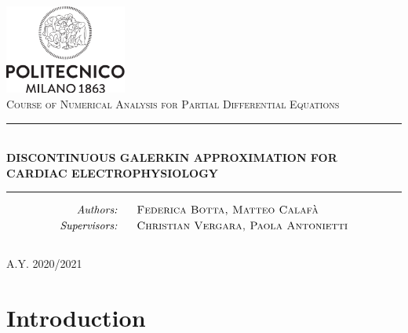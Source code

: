 \documentclass[a4paper,12pt]{article}
\begin{document}
	
	\begin{titlepage}
	    \thispagestyle{empty}
	    \begin{center}
	    	\includegraphics[width = 4cm]{./polimi-logo.png}\\ \vspace{3mm}
	    	\normalsize{\textsc{Course of Numerical Analysis for Partial Differential Equations}}
	    	
	    	\vspace{20mm}
	    	\rule{15cm}{0.1mm} \\ \vspace{4.5mm}
	    	 \Huge{\textbf{DISCONTINUOUS GALERKIN APPROXIMATION FOR CARDIAC ELECTROPHYSIOLOGY}} \\
	    	\rule{15cm}{0.1mm}
	    	\vspace{20mm}
	    	
	    	\Large{
	    	\begin{align*}
	    	\emph{Authors:}& \hspace{5mm} \textsc{ Federica Botta, Matteo Calafà}\\
	    	\emph{Supervisors:}& \hspace{5mm} \textsc{ Christian Vergara, Paola Antonietti}
	    	\end{align*}
	         } \\
	    	\vspace{35mm}
	    	\large{\textsc{A.Y. 2020/2021}}
	    \end{center}
	\end{titlepage}



    \restoregeometry
    
    \tableofcontents
    \newpage
    
    \section{Introduction}
\end{document}
